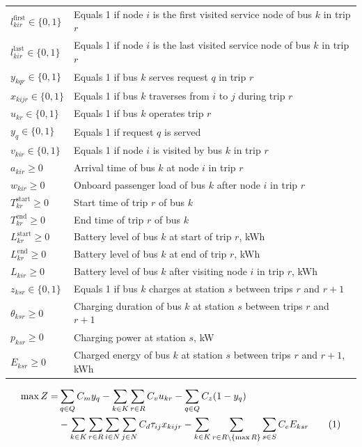 \documentclass[11pt]{article}
\begin{document}
\begin{longtable}{ll}
$l^{\text{first}}_{kir} \in \{0,1\}$ & Equals 1 if node $i$ is the first visited service node of bus $k$ in trip $r$ \\
$l^{\text{last}}_{kir} \in \{0,1\}$ & Equals 1 if node $i$ is the last visited service node of bus $k$ in trip $r$ \\
$y_{kqr} \in \{0,1\}$ & Equals 1 if bus \(k\) serves request \(q\) in trip \(r\) \\
$x_{kijr} \in \{0,1\}$ & Equals 1 if bus \(k\) traverses from \(i\) to \(j\) during trip \(r\) \\
$u_{kr} \in \{0,1\}$ & Equals 1 if bus \(k\) operates trip \(r\) \\
$y_q \in \{0,1\}$ & Equals 1 if request \(q\) is served \\
$v_{kir} \in \{0,1\}$ & Equals 1 if node \(i\) is visited by bus \(k\) in trip \(r\) \\
$a_{kir} \ge 0$ & Arrival time of bus \(k\) at node \(i\) in trip \(r\) \\
$w_{kir} \ge 0$ & Onboard passenger load of bus \(k\) after node \(i\) in trip \(r\) \\
$T^{\mathrm{start}}_{kr} \ge 0$ & Start time of trip \(r\) of bus \(k\) \\
$T^{\mathrm{end}}_{kr} \ge 0$ & End time of trip \(r\) of bus \(k\) \\
$L^{\mathrm{start}}_{kr} \ge 0$ & Battery level of bus \(k\) at start of trip \(r\), kWh \\
$L^{\mathrm{end}}_{kr} \ge 0$ & Battery level of bus \(k\) at end of trip \(r\), kWh \\
$L_{kir} \ge 0$ & Battery level of bus \(k\) after visiting node \(i\) in trip \(r\), kWh \\
$z_{ksr} \in \{0,1\}$ & Equals 1 if bus \(k\) charges at station \(s\) between trips \(r\) and \(r+1\) \\
$\theta_{ksr} \ge 0$ & Charging duration of bus \(k\) at station \(s\) between trips \(r\) and \(r+1\) \\
$p_{ksr} \ge 0$ & Charging power at station $s$, kW \\
$E_{ksr} \ge 0$ & Charged energy of bus \(k\) at station \(s\) between trips \(r\) and \(r+1\), kWh \\

\bottomrule
\end{longtable}

\begin{align}
\max Z
=& \sum_{q\in Q} C_m y_q
-\sum_{k\in K}\sum_{r\in R} C_v u_{kr}
-\sum_{q\in Q} C_z(1-y_q) \notag\\
&-\sum_{k\in K}\sum_{r\in R}\sum_{i\in N}\sum_{j\in N} C_d \tau_{ij} x_{kijr}
-\sum_{k\in K}\sum_{r\in R\setminus\{\max R\}}\sum_{s\in S} C_e E_{ksr}
\tag{1}
\end{align}
\end{document}
